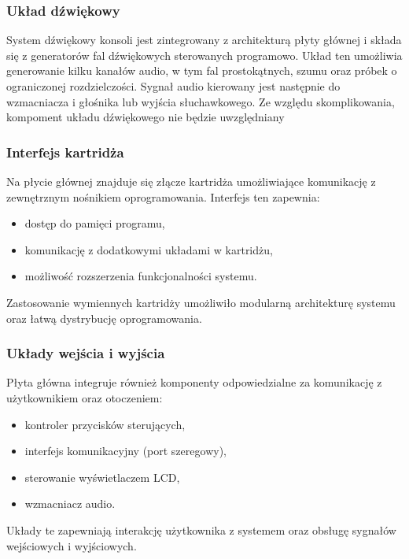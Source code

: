 \documentclass{article}
\begin{document}
\subsubsection{Układ dźwiękowy}

System dźwiękowy konsoli jest zintegrowany z architekturą płyty głównej i składa się z generatorów fal dźwiękowych sterowanych programowo. Układ ten umożliwia generowanie kilku kanałów audio, w tym fal prostokątnych, szumu oraz próbek o ograniczonej rozdzielczości. Sygnał audio kierowany jest następnie do wzmacniacza i głośnika lub wyjścia słuchawkowego. Ze względu skomplikowania, kompoment układu dźwiękowego nie będzie uwzględniany

\subsubsection{Interfejs kartridża}

Na płycie głównej znajduje się złącze kartridża umożliwiające komunikację z zewnętrznym nośnikiem oprogramowania. Interfejs ten zapewnia:

\begin{itemize}
	\item dostęp do pamięci programu,
	\item komunikację z dodatkowymi układami w kartridżu,
	\item możliwość rozszerzenia funkcjonalności systemu.
\end{itemize}

Zastosowanie wymiennych kartridży umożliwiło modularną architekturę systemu oraz łatwą dystrybucję oprogramowania.

\subsubsection{Układy wejścia i wyjścia}

Płyta główna integruje również komponenty odpowiedzialne za komunikację z użytkownikiem oraz otoczeniem:

\begin{itemize}
	\item kontroler przycisków sterujących,
	\item interfejs komunikacyjny (port szeregowy),
	\item sterowanie wyświetlaczem LCD,
	\item wzmacniacz audio.
\end{itemize}

Układy te zapewniają interakcję użytkownika z systemem oraz obsługę sygnałów wejściowych i wyjściowych.
\end{document}
